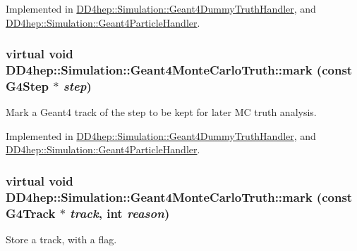 Implemented in \hyperlink{class_d_d4hep_1_1_simulation_1_1_geant4_dummy_truth_handler_a0387d2cf651a83c45242962f80c41096}{DD4hep::Simulation::Geant4DummyTruthHandler}, and \hyperlink{class_d_d4hep_1_1_simulation_1_1_geant4_particle_handler_a7a351cfb66cc4e50b9f184b2e80855f4}{DD4hep::Simulation::Geant4ParticleHandler}.\hypertarget{class_d_d4hep_1_1_simulation_1_1_geant4_monte_carlo_truth_a6aa3674a7c9e2f0132251bf05c7dab88}{
\subsubsection[{mark}]{\setlength{\rightskip}{0pt plus 5cm}virtual void DD4hep::Simulation::Geant4MonteCarloTruth::mark (const G4Step $\ast$ {\em step})}}
\label{class_d_d4hep_1_1_simulation_1_1_geant4_monte_carlo_truth_a6aa3674a7c9e2f0132251bf05c7dab88}


Mark a Geant4 track of the step to be kept for later MC truth analysis. 

Implemented in \hyperlink{class_d_d4hep_1_1_simulation_1_1_geant4_dummy_truth_handler_a19f10fada0444ae5f60deb1d92761969}{DD4hep::Simulation::Geant4DummyTruthHandler}, and \hyperlink{class_d_d4hep_1_1_simulation_1_1_geant4_particle_handler_aa03024ccc930c57fcfcd515605072f4b}{DD4hep::Simulation::Geant4ParticleHandler}.\hypertarget{class_d_d4hep_1_1_simulation_1_1_geant4_monte_carlo_truth_a6b63ab3d0ac424aba1088fb9ea2994dc}{
\subsubsection[{mark}]{\setlength{\rightskip}{0pt plus 5cm}virtual void DD4hep::Simulation::Geant4MonteCarloTruth::mark (const G4Track $\ast$ {\em track}, \/  int {\em reason})}}
\label{class_d_d4hep_1_1_simulation_1_1_geant4_monte_carlo_truth_a6b63ab3d0ac424aba1088fb9ea2994dc}


Store a track, with a flag. 

